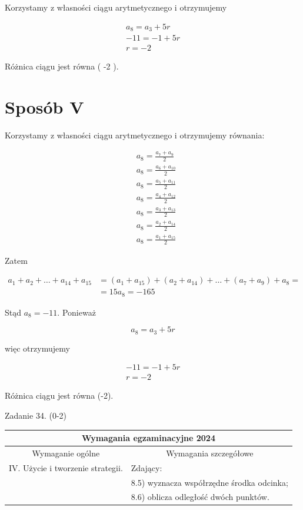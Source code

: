 \documentclass[10pt]{article}
\begin{document}
Korzystamy z własności ciągu arytmetycznego i otrzymujemy

$$
\begin{gathered}
a_{8}=a_{3}+5 r \\
-11=-1+5 r \\
r=-2
\end{gathered}
$$

Różnica ciągu jest równa ( -2 ).

\section*{Sposób V}
Korzystamy z własności ciągu arytmetycznego i otrzymujemy równania:

$$
\begin{aligned}
& a_{8}=\frac{a_{7}+a_{9}}{2} \\
& a_{8}=\frac{a_{6}+a_{10}}{2} \\
& a_{8}=\frac{a_{5}+a_{11}}{2} \\
& a_{8}=\frac{a_{4}+a_{12}}{2} \\
& a_{8}=\frac{a_{3}+a_{13}}{2} \\
& a_{8}=\frac{a_{2}+a_{14}}{2} \\
& a_{8}=\frac{a_{1}+a_{15}}{2}
\end{aligned}
$$

Zatem

$$
\begin{aligned}
a_{1}+a_{2}+\ldots+a_{14}+a_{15} & =\left(a_{1}+a_{15}\right)+\left(a_{2}+a_{14}\right)+\ldots+\left(a_{7}+a_{9}\right)+a_{8}= \\
& =15 a_{8}=-165
\end{aligned}
$$

Stąd $a_{8}=-11$. Ponieważ

$$
a_{8}=a_{3}+5 r
$$

więc otrzymujemy

$$
\begin{gathered}
-11=-1+5 r \\
r=-2
\end{gathered}
$$

Różnica ciągu jest równa (-2).

Zadanie 34. (0-2)

\begin{center}
\begin{tabular}{|l|l|}
\hline
\multicolumn{2}{|c|}{Wymagania egzaminacyjne 2024} \\
\hline
\multicolumn{1}{|c|}{Wymaganie ogólne} & \multicolumn{1}{c|}{Wymagania szczegółowe} \\
\hline
IV. Użycie i tworzenie strategii. & Zdający: \\
 & 8.5) wyznacza współrzędne środka odcinka; \\
 & 8.6) oblicza odległość dwóch punktów. \\
\hline
\end{tabular}
\end{center}
\end{document}
